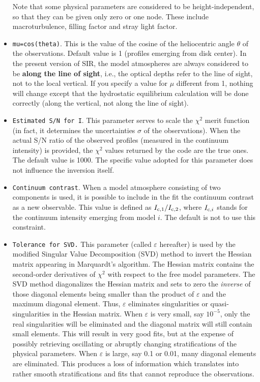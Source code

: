 \documentclass[11pt]{report}
\begin{document}
\begin{itemize}
Note that some physical parameters are considered to be
height-independent, so that they can be given only zero or one node.
These include macroturbulence, filling factor and stray light factor.

\item {\tt mu=cos(theta)}. This is the value of the cosine of the
heliocentric angle $\theta$ of the observations. Default value is 1
(profiles emerging from disk center). In the present version of 
SIR, the model atmospheres are always considered to be {\bf along 
the line of sight}, i.e., the optical depths refer to the line of 
sight, not to the local vertical. If you specify a value for $\mu$ 
different from 1, nothing will change except that the hydrostatic 
equilibrium calculation will be done correctly (along the vertical, 
not along the line of sight).  

\item {\tt Estimated S/N for I}. This parameter serves to scale the
$\chi^2$ merit function (in fact, it determines the uncertainties
$\sigma$ of the observations). When the actual S/N ratio of the
observed profiles (measured in the continuum intensity) is provided,
the $\chi^2$ values returned by the code are the true ones. The default
value is 1000. The specific value adopted for this parameter does not
influence the inversion itself.

\item {\tt Continuum contrast}. When a model atmosphere consisting of
two components is used, it is possible to include in the fit the
continuum contrast as a new observable.  This value is defined as
$I_{{\rm c},1}/I_{{\rm c},2}$, where $I_{{\rm c},i}$ stands for the
continuum intensity emerging from model $i$. The default is not to use
this constraint.

\item {\tt Tolerance for SVD.} This parameter (called $\varepsilon$
hereafter) is used by the modified Singular Value Decomposition (SVD)
method to invert the Hessian matrix appearing in Marquardt's algorithm.
The Hessian matrix contains the second-order derivatives of $\chi^2$
with respect to the free model parameters. The SVD method diagonalizes
the Hessian matrix and sets to zero the {\em inverse} of those diagonal
elements being smaller than the product of $\varepsilon$ and the
maximum diagonal element.  Thus, $\varepsilon$ eliminates singularities
or quasi-singularities in the Hessian matrix.  When $\varepsilon$ is
very small, say $10^{-5}$, only the real singularities will be
eliminated and the diagonal matrix will still contain small elements.
This will result in very good fits, but at the expense of possibly
retrieving oscillating or abruptly changing stratifications of the
physical parameters. When $\varepsilon$ is large, say 0.1 or 0.01, many
diagonal elements are eliminated. This produces a loss of information
which translates into rather smooth stratifications and fits that
cannot reproduce the observations.


\end{itemize}
\end{document}
